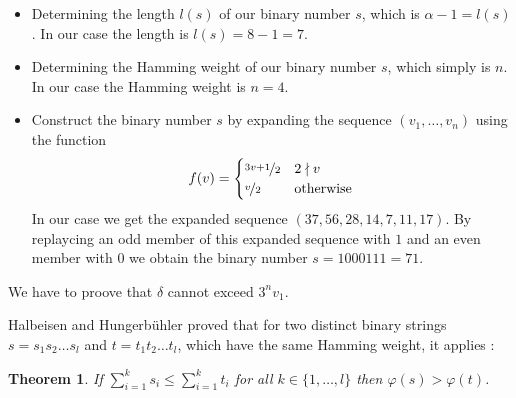 \documentclass[12pt]{amsart}
\newtheorem{theorem}{Theorem}
\theoremstyle{definition}
\begin{document}
\begin{itemize}
\item Determining the length $l(s)$ of our binary number $s$, which is $\alpha-1=l(s)$. In our case the length is $l(s)=8-1=7$.
\item Determining the Hamming weight of our binary number $s$, which simply is $n$. In our case the Hamming weight is $n=4$.
\item Construct the binary number $s$ by expanding the sequence $(v_1,\ldots,v_n)$ using the function
\[
f(v)=
\begin{cases}
	\nicefrac{3v+1}{2}	&	2\nmid v\\
	\nicefrac{v}{2}		&	\text{otherwise}
\end{cases}
\]
In our case we get the expanded sequence $(37,56,28,14,7,11,17)$. By replaycing an odd member of this expanded sequence with $1$ and an even member with $0$ we obtain the binary number $s=1000111=71$. 
\end{itemize}

\par\medskip\noindent
We have to proove that $\delta$ cannot exceed $3^nv_1$.

\par\medskip\noindent
Halbeisen and Hungerbühler proved that for two distinct binary strings $s=s_1s_2\ldots s_l$ and $t=t_1t_2\ldots t_l$, which have the same Hamming weight, it applies \cite{Halbeisen_Hungerbuehler_1997}:

\begin{theorem}
\label{theo:HH_1}
If $\sum_{i=1}^{k}s_i\le\sum_{i=1}^{k}t_i$ for all $k\in\{1,\ldots,l\}$ then $\varphi(s)>\varphi(t)$.
\end{theorem}

%


\end{document}
